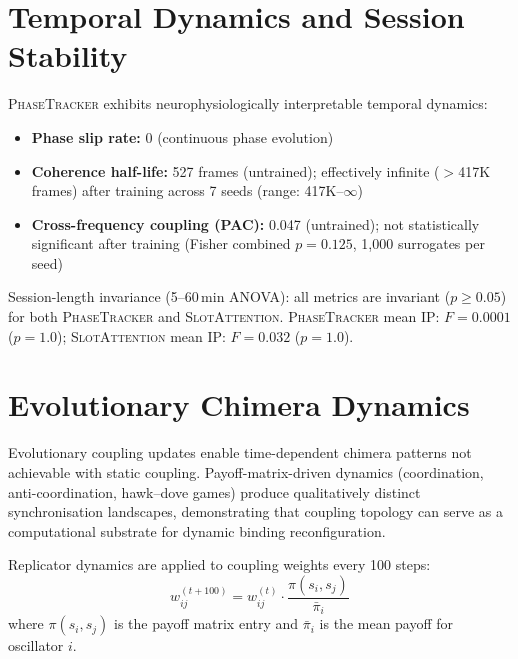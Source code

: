 \documentclass[11pt]{article}
\providecommand{\pt}{\textnormal{\textsc{PhaseTracker}}\xspace}
\providecommand{\sa}{\textnormal{\textsc{SlotAttention}}\xspace}
\begin{document}
\section{Temporal Dynamics and Session Stability}
\label{app:temporal}

\pt exhibits neurophysiologically interpretable temporal dynamics:
\begin{itemize}
  \item \textbf{Phase slip rate:} 0 (continuous phase evolution)
  \item \textbf{Coherence half-life:} 527 frames (untrained);
        effectively infinite ($>$417K frames) after training
        across 7 seeds (range: 417K--$\infty$)
  \item \textbf{Cross-frequency coupling (PAC):} 0.047 (untrained);
        not statistically significant after training
        (Fisher combined $p = 0.125$, 1{,}000 surrogates per seed)
\end{itemize}

Session-length invariance (5--60\,min ANOVA): all metrics are
invariant ($p \geq 0.05$) for both \pt and \sa.  \pt mean IP:
$F = 0.0001$ ($p = 1.0$); \sa mean IP: $F = 0.032$ ($p = 1.0$).

\section{Evolutionary Chimera Dynamics}
\label{app:evolutionary}

Evolutionary coupling updates enable time-dependent chimera patterns
not achievable with static coupling.  Payoff-matrix-driven dynamics
(coordination, anti-coordination, hawk--dove games) produce
qualitatively distinct synchronisation landscapes, demonstrating that
coupling topology can serve as a computational substrate for dynamic
binding reconfiguration.

Replicator dynamics are applied to coupling weights every 100 steps:
\begin{equation}
  w_{ij}^{(t+100)} = w_{ij}^{(t)}
  \cdot \frac{\pi(s_i, s_j)}{\bar{\pi}_i}
\end{equation}
where $\pi(s_i, s_j)$ is the payoff matrix entry and $\bar{\pi}_i$
is the mean payoff for oscillator $i$.
\end{document}
